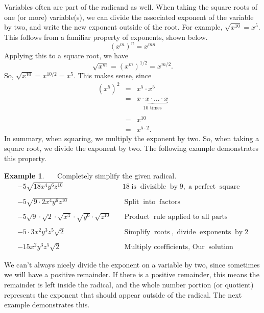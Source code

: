 \documentclass[12pt]{book}
\theoremstyle{definition}
\newtheorem{example}{Example}
\newcommand{\tmop}[1]{\ensuremath{\operatorname{#1}}}
\begin{document}
Variables often are part of the radicand as well. When taking the square roots of one (or more) variable(s), we can divide the associated exponent of the variable by two, and write the new exponent outside of the root. For example, $\sqrt{x^{10}}= x^5$. This follows from a familiar property of exponents, shown below.
$$\left(x^m\right)^n=x^{mn}$$
Applying this to a square root, we have
$$\sqrt{x^m}=\left(x^m\right)^{1/2}=x^{m/2}.$$
So, $\sqrt{x^{10}}=x^{10/2} = x^5$.  This makes sense, since 
\begin{eqnarray*}
\left(x^5\right)^2 & = & x^5\cdot x^5\\
 & = & \underbrace{x\cdot x\cdot\ldots\cdot x}_{\text{10 times}}\\
 &&\\
 & = & x^{10}\\
 & = & x^{5\cdot 2}.
\end{eqnarray*}  
In summary, when squaring, we multiply the exponent by two.  So, when taking a square root, we divide the exponent by two.
The following example demonstrates this property.
\begin{example}~~~Completely simplify the given radical.
  \begin{eqnarray*}
    - 5 \sqrt{18 x^4 y^6 z^{10}} &  & 18 \tmop{is} \tmop{divisible} \tmop{by}
    9, \tmop{a~perfect} \tmop{square}\\
    & & \\
		- 5 \sqrt{9 \cdot 2 x^4 y^6 z^{10}} &  & \tmop{Split} \tmop{into}
    \tmop{factors}\\
    & & \\
		- 5 \sqrt{9} \cdot \sqrt{2} \cdot \sqrt{x^4} \cdot \sqrt{y^6} \cdot
    \sqrt{z^{10}} &  & \tmop{Product} \tmop{rule~applied~to~all~parts}\\
		& & \\
		- 5 \cdot 3 x^2 y^3 z^5 \sqrt{2} & & \tmop{Simplify} \tmop{roots}, \tmop{divide} \tmop{exponents} \tmop{by} 2\\
    & & \\
		- 15 x^2 y^3 z^5 \sqrt{2} &  & \tmop{Multiply~coefficients,~Our} \tmop{solution}
  \end{eqnarray*}
\end{example}
We can't always nicely divide the exponent on a variable by two, since sometimes we will have a positive remainder. If there is a positive remainder, this means the remainder is left inside the radical, and the whole number portion (or quotient) represents the exponent that should appear outside of the radical. The next example demonstrates this.
\end{document}

